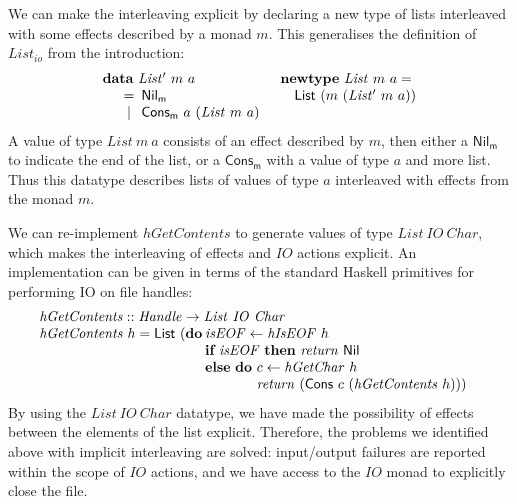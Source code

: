 \documentclass{jfp1}
\newcommand{\kw}[1]{\textbf{#1}}
\begin{document}
We can make the interleaving explicit by declaring a new type of lists
interleaved with some effects described by a monad $m$. This
generalises the definition of $\mathit{List_{io}}$ from the
introduction:
\begin{displaymath}
  \begin{array}{ll}
    \kw{data}~\mathit{List'}~m~a
    &
    \kw{newtype}~\mathit{List}~m~a = 
    \\
    \quad
    \begin{array}[t]{c@{\hspace{0.5em}}l}
      = & \mathsf{Nil_m} \\
      | & \mathsf{Cons_m}~a~(\mathit{List}~m~a) \\
    \end{array}
    &
    \quad \mathsf{List}~(m~(\mathit{List'}~m~a))
  \end{array}
\end{displaymath}
A value of type $\mathit{List}~m~a$ consists of an effect described by
$m$, then either a $\mathsf{Nil_m}$ to indicate the end of the list,
or a $\mathsf{Cons_m}$ with a value of type $a$ and more list. Thus
this datatype describes lists of values of type $a$ interleaved with
effects from the monad $m$.

We can re-implement $\mathit{hGetContents}$ to generate values of type
$\mathit{List}~\mathit{IO}~\mathit{Char}$, which makes the
interleaving of effects and $\mathit{IO}$ actions explicit. An
implementation can be given in terms of the standard Haskell
primitives for performing IO on file handles:
\begin{displaymath}
  \begin{array}{l}
  \mathit{hGetContents} :: \mathit{Handle} \to \mathit{List}~\mathit{IO}~\mathit{Char} \\
  \begin{array}{@{}l@{\hspace{0.2em}}l}
    \mathit{hGetContents}~h = \mathsf{List}~(\kw{do} & \mathit{isEOF} \leftarrow \mathit{hIsEOF}~h \\
    & \kw{if}~\mathit{isEOF}~\kw{then}~\mathit{return}~\mathsf{Nil} \\
    & \kw{else}~\kw{do}~
    \begin{array}[t]{@{}l}
      c \leftarrow \mathit{hGetChar}~h \\
      \mathit{return}~(\mathsf{Cons}~c~(\mathit{hGetContents}~h)))
    \end{array}
  \end{array}
\end{array}
\end{displaymath}
By using the $\mathit{List}~\mathit{IO}~\mathit{Char}$ datatype, we
have made the possibility of effects between the elements of the list
explicit. Therefore, the problems we identified above with implicit
interleaving are solved: input/output failures are reported within the
scope of $\mathit{IO}$ actions, and we have access to the
$\mathit{IO}$ monad to explicitly close the file.
\end{document}
